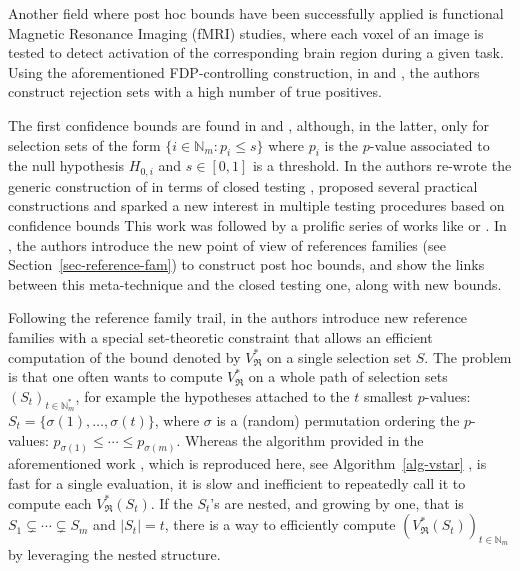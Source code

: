 \documentclass[
  11pt,
  a4paper,
]{article}
\theoremstyle{definition}
\theoremstyle{plain}
\theoremstyle{plain}
\theoremstyle{plain}
\theoremstyle{definition}
\theoremstyle{remark}
\begin{document}
Another field where post hoc bounds have been successfully applied is
functional Magnetic Resonance Imaging (fMRI) studies, where each voxel
of an image is tested to detect activation of the corresponding brain
region during a given task. Using the aforementioned FDP-controlling
construction, in \citet{blain22notip} and \citet{NEURIPS2023_f6712d51},
the authors construct rejection sets with a high number of true
positives.

The first confidence bounds are found in \citet{MR2279468} and
\citet{MR2279639}, although, in the latter, only for selection sets of
the form \(\{i\in\mathbb{N}_m: p_i\leq s\}\) where \(p_i\) is the
\(p\)-value associated to the null hypothesis \(H_{0,i}\) and
\(s\in[0,1]\) is a threshold. In \citet{MR2951390} the authors re-wrote
the generic construction of \citet{MR2279468} in terms of closed testing
\citep{MR468056}, proposed several practical constructions and sparked a
new interest in multiple testing procedures based on confidence bounds
This work was followed by a prolific series of works like
\citet{MR3305943} or \citet{MR4731977}. In \citet{MR4124323}, the
authors introduce the new point of view of references families (see
Section~\ref{sec-reference-fam}) to construct post hoc bounds, and show
the links between this meta-technique and the closed testing one, along
with new bounds.

Following the reference family trail, in \citet{MR4178188} the authors
introduce new reference families with a special set-theoretic constraint
that allows an efficient computation of the bound denoted by
\(V^*_{\mathfrak{R}}\) on a single selection set \(S\). The problem is
that one often wants to compute \(V^*_{\mathfrak{R}}\) on a whole path
of selection sets \((S_t)_{t\in\mathbb{N}_m^*}\), for example the
hypotheses attached to the \(t\) smallest \(p\)-values:
\(S_t=\{\sigma(1),\dots,\sigma(t)\}\), where \(\sigma\) is a (random)
permutation ordering the \(p\)-values:
\(p_{\sigma(1)}\leq\dotsb\leq p_{\sigma(m)}\). Whereas the algorithm
provided in the aforementioned work \citep[Algorithm 1]{MR4178188},
which is reproduced here, see  Algorithm~\ref{alg-vstar} , is fast for a
single evaluation, it is slow and inefficient to repeatedly call it to
compute each \(V^*_{\mathfrak{R}}(S_t)\). If the \(S_t\)'s are nested,
and growing by one, that is \(S_1\subsetneq\dotsb\subsetneq S_m\) and
\(|S_t|=t\), there is a way to efficiently compute
\(\left(V^*_{\mathfrak{R}}(S_t)\right)_{t\in\mathbb{N}_m}\) by
leveraging the nested structure.
\end{document}
